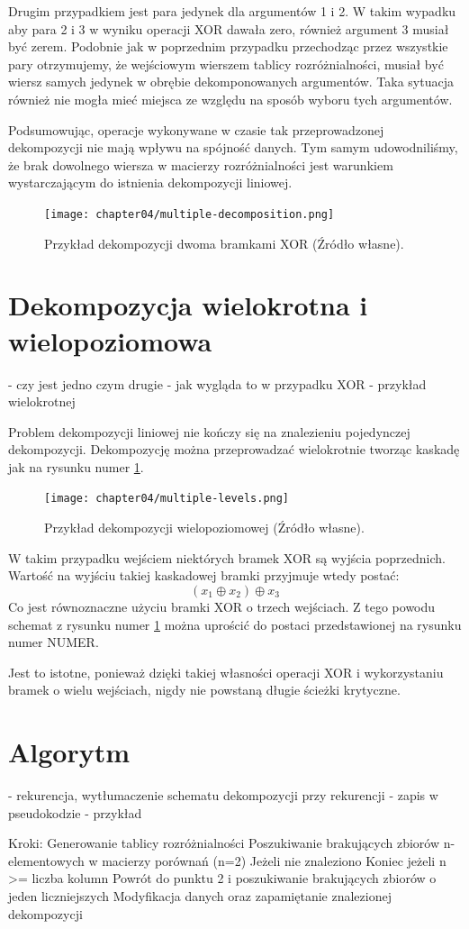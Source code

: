 Drugim przypadkiem jest para jedynek dla argumentów 1 i 2.
W takim wypadku aby para 2 i 3 w wyniku operacji XOR dawała zero,
również argument 3 musiał być zerem.
Podobnie jak w poprzednim przypadku przechodząc przez wszystkie pary otrzymujemy,
że wejściowym wierszem tablicy rozróżnialności,
musiał być wiersz samych jedynek w obrębie dekomponowanych argumentów.
Taka sytuacja również nie mogła mieć miejsca ze względu na sposób wyboru tych argumentów.

Podsumowując,
operacje wykonywane w czasie tak przeprowadzonej dekompozycji nie mają wpływu na spójność danych.
Tym samym udowodniliśmy,
że brak dowolnego wiersza w macierzy rozróżnialności jest warunkiem wystarczającym do istnienia dekompozycji liniowej.

\begin{figure}[H]
\centering
\texttt{[image: chapter04/multiple-decomposition.png]}
\caption{Przykład dekompozycji dwoma bramkami XOR (Źródło własne).}
\end{figure}

\section{Dekompozycja wielokrotna i wielopoziomowa}
	- czy jest jedno czym drugie
	- jak wygląda to w przypadku XOR
	- przykład wielokrotnej

Problem dekompozycji liniowej nie kończy się na znalezieniu pojedynczej dekompozycji.
Dekompozycję można przeprowadzać wielokrotnie tworząc kaskadę jak na rysunku numer \ref{fig:multiple-levels}.

\begin{figure}[H]
\centering
\texttt{[image: chapter04/multiple-levels.png]}
\caption{Przykład dekompozycji wielopoziomowej (Źródło własne).}
\label{fig:multiple-levels}
\end{figure}

W takim przypadku wejściem niektórych bramek XOR są wyjścia poprzednich.
Wartość na wyjściu takiej kaskadowej bramki przyjmuje wtedy postać:
\begin{equation}
(x_1 \oplus x_2) \oplus x_3
\end{equation}
Co jest równoznaczne użyciu bramki XOR o trzech wejściach.
Z tego powodu schemat z rysunku numer \ref{fig:multiple-levels} można uprościć do postaci przedstawionej na rysunku numer NUMER.

Jest to istotne,
ponieważ dzięki takiej własności operacji XOR i wykorzystaniu bramek o wielu wejściach,
nigdy nie powstaną długie ścieżki krytyczne.

\section{Algorytm}
- rekurencja, wytłumaczenie schematu dekompozycji przy rekurencji
- zapis w pseudokodzie
- przykład

Kroki:
Generowanie tablicy rozróżnialności
Poszukiwanie brakujących zbiorów n-elementowych w macierzy porównań (n=2)
Jeżeli nie znaleziono
Koniec jeżeli n >= liczba kolumn
Powrót do punktu 2 i poszukiwanie brakujących zbiorów o jeden liczniejszych
Modyfikacja danych oraz zapamiętanie znalezionej dekompozycji
